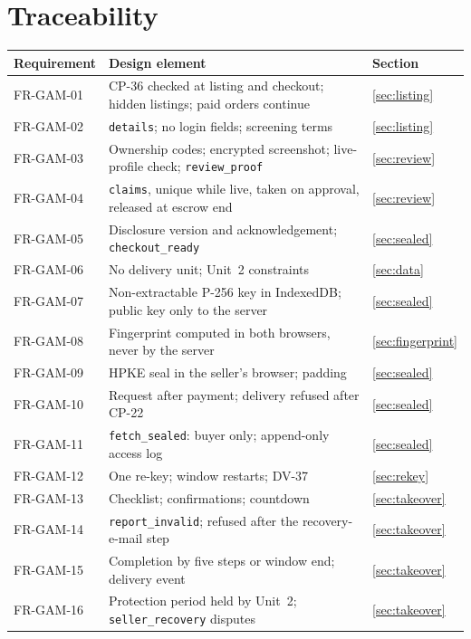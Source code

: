 \documentclass[11pt,a4paper]{article}
\begin{document}
\section{Traceability}
\label{app:trace}
{\small\begin{longtable}{@{}>{\ttfamily}p{2.4cm}>{\raggedright\arraybackslash}p{10.6cm}>{\raggedright\arraybackslash}p{2.2cm}@{}}
\toprule \textnormal{\textbf{Requirement}} & \textbf{Design element} & \textbf{Section} \\ \midrule \endhead
FR-GAM-01 & CP-36 checked at listing and checkout; hidden listings; paid orders continue & \ref{sec:listing} \\
FR-GAM-02 & \texttt{details}; no login fields; screening terms & \ref{sec:listing} \\
FR-GAM-03 & Ownership codes; encrypted screenshot; live-profile check; \texttt{review\_proof} & \ref{sec:review} \\
FR-GAM-04 & \texttt{claims}, unique while live, taken on approval, released at escrow end & \ref{sec:review} \\
FR-GAM-05 & Disclosure version and acknowledgement; \texttt{checkout\_ready} & \ref{sec:sealed} \\
FR-GAM-06 & No delivery unit; Unit~2 constraints & \ref{sec:data} \\
FR-GAM-07 & Non-extractable P-256 key in IndexedDB; public key only to the server & \ref{sec:sealed} \\
FR-GAM-08 & Fingerprint computed in both browsers, never by the server & \ref{sec:fingerprint} \\
FR-GAM-09 & HPKE seal in the seller's browser; padding & \ref{sec:sealed} \\
FR-GAM-10 & Request after payment; delivery refused after CP-22 & \ref{sec:sealed} \\
FR-GAM-11 & \texttt{fetch\_sealed}: buyer only; append-only access log & \ref{sec:sealed} \\
FR-GAM-12 & One re-key; window restarts; DV-37 & \ref{sec:rekey} \\
FR-GAM-13 & Checklist; confirmations; countdown & \ref{sec:takeover} \\
FR-GAM-14 & \texttt{report\_invalid}; refused after the recovery-e-mail step & \ref{sec:takeover} \\
FR-GAM-15 & Completion by five steps or window end; delivery event & \ref{sec:takeover} \\
FR-GAM-16 & Protection period held by Unit~2; \texttt{seller\_recovery} disputes & \ref{sec:takeover} \\

\end{longtable}}
\end{document}
